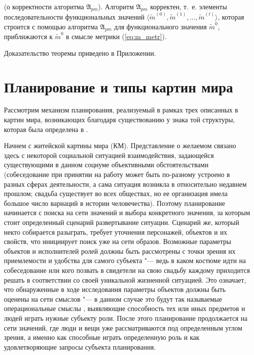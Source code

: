 \documentclass[a4paper, 12pt]{article}
\newcommand{\stretchsize}{2}
\renewcommand{\baselinestretch}{\stretchsize}
\numberwithin{equation}{section}
\begin{document}
	\renewcommand{\baselinestretch}{1}		
	\begin{algorithm}[H]
		\label{alg:cycle_pm}
		\begin{algorithmic}[1]
			
			
		\end{algorithmic}		
	\end{algorithm}
	\renewcommand{\baselinestretch}{\stretchsize}
		
	 (о корректности алгоритма $\mathfrak A_{pm}$).\label{th:pm_correct} Алгоритм $\mathfrak A_{pm}$ корректен, т.~е. элементы последовательности функциональных значений $\langle\tilde m^{(0)},\tilde m^{(1)},\dots,\tilde m^{(t)}\rangle$, которая строится с помощью алгоритма $\mathfrak A_{pm}$ для функционального значения $\tilde m^0$, приближаются к $\tilde m^0$ в смысле метрики (\ref{eq:m_metr}).
	
	Доказательство теоремы приведено в Приложении.
	
	\section{Планирование и типы картин мира} \label{sect:plan_wm}
	Рассмотрим механизм планирования, реализуемый в рамках трех описанных в \cite{Chudova2012a} картин мира, возникающих благодаря существованию у знака той структуры, которая была определена в \cite{PanovA2014a}.
	
	Начнем с житейской картины мира (КМ). Представление о желаемом связано здесь с некоторой социальной ситуацией взаимодействия, задающейся существующими в данном социуме объективными обстоятельствами (собеседование при принятии на работу может быть по-разному устроено в разных сферах деятельности, а сама ситуация возникла в относительно недавнем прошлом; свадьба существует во всех обществах, но ее организация имела большое число вариаций в истории человечества). Поэтому планирование начинается с поиска на сети значений и выбора конкретного значения, за которым стоит определенный сценарий развертывание ситуации. Сценарий же, который некто собирается разыграть, требует уточнения персонажей, объектов и их свойств, что инициирует поиск уже на сети образов. Возможные параметры объектов и исполнителей ролей должны быть рассмотрены с точки зрения их приемлемости и удобства для самого субъекта "--- ведь в каком костюме идти на собеседование или кого позвать в свидетели на свою свадьбу каждому приходится решать в соответствии со своей уникальной жизненной ситуацией. Это означает, что обнаруженные в ходе исследования параметры объектов должны быть оценены на сети смыслов "--- в данном случае это будут так называемые операциональные смыслы \cite{Tikhomirov2002}, выявляющие способность тех или иных предметов и людей играть нужные субъекту роли. После этого планирование продолжается на сети значений, где люди и вещи уже рассматриваются под определенным углом зрения, а именно как способные играть определенную роль и как удовлетворяющие запросы субъекта планирования.
	
\end{document}
